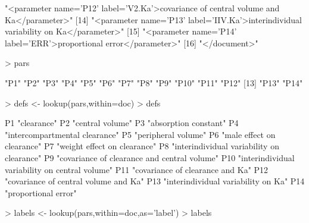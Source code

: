 \begin{Schunk}
\begin{Soutput}
[13] "<parameter name='P12' label='V2.Ka'>covariance of central volume and Ka</parameter>"           
[14] "<parameter name='P13' label='IIV.Ka'>interindividual variability on Ka</parameter>"            
[15] "<parameter name='P14' label='ERR'>proportional error</parameter>"                              
[16] "</document>"                                                                                   
\end{Soutput}
\begin{Sinput}
> pars
\end{Sinput}
\begin{Soutput}
 [1] "P1"  "P2"  "P3"  "P4"  "P5"  "P6"  "P7"  "P8"  "P9"  "P10" "P11" "P12"
[13] "P13" "P14"
\end{Soutput}
\begin{Sinput}
> defs <- lookup(pars,within=doc)
> defs
\end{Sinput}
\begin{Soutput}
                                             P1 
                                    "clearance" 
                                             P2 
                               "central volume" 
                                             P3 
                          "absorption constant" 
                                             P4 
                 "intercompartmental clearance" 
                                             P5 
                            "peripheral volume" 
                                             P6 
                     "male effect on clearance" 
                                             P7 
                   "weight effect on clearance" 
                                             P8 
     "interindividual variability on clearance" 
                                             P9 
   "covariance of clearance and central volume" 
                                            P10 
"interindividual variability on central volume" 
                                            P11 
               "covariance of clearance and Ka" 
                                            P12 
          "covariance of central volume and Ka" 
                                            P13 
            "interindividual variability on Ka" 
                                            P14 
                           "proportional error" 
\end{Soutput}
\begin{Sinput}
> labels <- lookup(pars,within=doc,as='label')
> labels
\end{Sinput}
\begin{Soutput}

\end{Soutput}
\end{Schunk}
